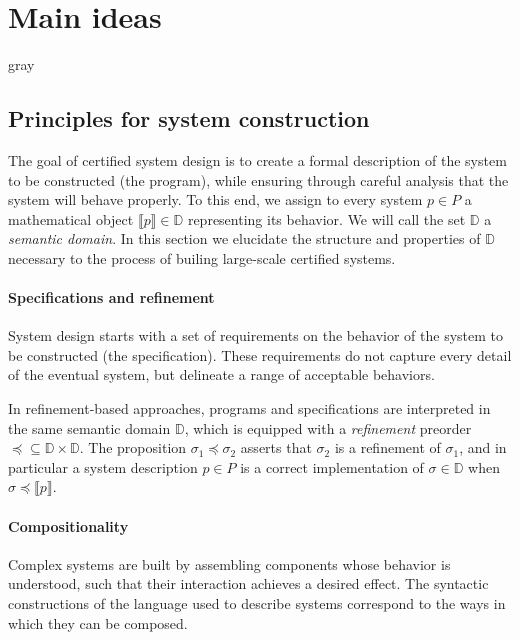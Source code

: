 \documentclass[acmsmall,screen,review,anonymous]{acmart}
\newcommand{\refby}{\preceq}
\newenvironment{optional}{\begin{color}{gray}}{\end{color}}
\begin{document}
\section{Main ideas} \label{sec:mainideas} %

\begin{optional}
\subsection{Principles for system construction} \label{sec:principles} %


The goal of certified system design is
to create a formal description of
the system to be constructed (the program),
while ensuring
through careful analysis
that the system
will behave properly.
To this end,
we assign
to every system $p \in P$
a mathematical object $\llbracket p \rrbracket \in \mathbb{D}$
representing its behavior.
We will call the set $\mathbb{D}$ a \emph{semantic domain}.
In this section we elucidate
the structure and properties of $\mathbb{D}$
necessary to the process of builing
large-scale certified systems.


\paragraph{Specifications and refinement} %

System design starts with a set of requirements
on the behavior of the system to be constructed
(the specification).
These requirements do not capture every detail
of the eventual system,
but delineate a range of acceptable behaviors.

In refinement-based approaches,
programs and specifications are interpreted in the same
semantic domain $\mathbb{D}$,
which is equipped with a \emph{refinement} preorder
${\refby} \subseteq \mathbb{D} \times \mathbb{D}$.
The proposition $\sigma_1 \refby \sigma_2$
asserts that $\sigma_2$ is a refinement of $\sigma_1$,
and in particular a system description $p \in P$ is a correct implementation
of $\sigma \in \mathbb{D}$ when
$\sigma \refby \llbracket p \rrbracket$.


\paragraph{Compositionality} %

Complex systems are built by assembling components
whose behavior is understood,
such that their interaction achieves a desired effect.
The syntactic constructions of
the language used to describe systems
correspond to the ways in which they can be composed.


\end{optional}
\end{document}
